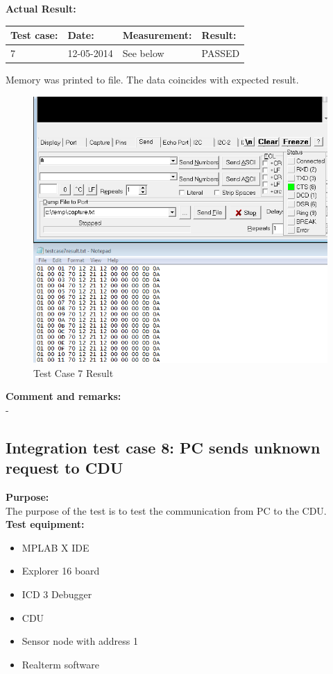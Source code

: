 \textbf{Actual Result:}\\
\begin{table}[H]
\centering
\begin{tabular}{|p{2cm}|p{2cm}|p{3cm}|p{2cm}|}\hline
\textbf{Test case:} & \textbf{Date:} & \textbf{Measurement:} & \textbf{Result:} \\ \hline
7 & 12-05-2014 & See below & PASSED \\ \hline
\end{tabular}
\end{table}
Memory was printed to file. The data coincides with expected result.
\begin{figure}[H]
\centering
\includegraphics[width=1\textwidth]{billeder/inte07}
\caption{Test Case 7 Result}
\label{fig:InteTestCase7}
\end{figure}

\textbf{Comment and remarks:}\\
-\\

\subsection{Integration test case 8: PC sends unknown request to CDU}
\textbf{Purpose:}\\
The purpose of the test is to test the communication from PC to the CDU.\\

\textbf{Test equipment:}
\begin{itemize}
\item MPLAB X IDE
\item Explorer 16 board
\item ICD 3 Debugger
\item CDU
\item Sensor node with address 1
\item Realterm software
\end{itemize}

